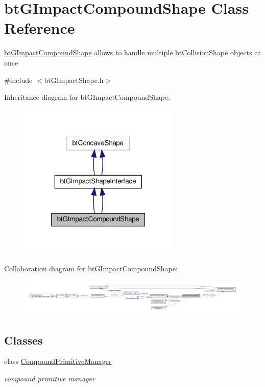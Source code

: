 \hypertarget{classbtGImpactCompoundShape}{}\section{bt\+G\+Impact\+Compound\+Shape Class Reference}
\label{classbtGImpactCompoundShape}


\hyperlink{classbtGImpactCompoundShape}{bt\+G\+Impact\+Compound\+Shape} allows to handle multiple bt\+Collision\+Shape objects at once  




{\ttfamily \#include $<$bt\+G\+Impact\+Shape.\+h$>$}



Inheritance diagram for bt\+G\+Impact\+Compound\+Shape\+:
\nopagebreak
\begin{figure}[H]
\begin{center}
\leavevmode
\includegraphics[width=217pt]{classbtGImpactCompoundShape__inherit__graph}
\end{center}
\end{figure}


Collaboration diagram for bt\+G\+Impact\+Compound\+Shape\+:
\nopagebreak
\begin{figure}[H]
\begin{center}
\leavevmode
\includegraphics[width=350pt]{classbtGImpactCompoundShape__coll__graph}
\end{center}
\end{figure}
\subsection*{Classes}
\begin{DoxyCompactItemize}
\item 
class \hyperlink{classbtGImpactCompoundShape_1_1CompoundPrimitiveManager}{Compound\+Primitive\+Manager}
\begin{DoxyCompactList}\small\item\em compound primitive manager \end{DoxyCompactList}\end{DoxyCompactItemize}
